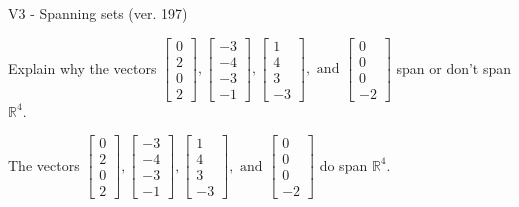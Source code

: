 \begin{exercise}
  \begin{exerciseTitle}V3 - Spanning sets (ver. 197)\end{exerciseTitle}
  \begin{exerciseStatement}
    Explain why the vectors \(\left[\begin{array}{r}
0 \\
2 \\
0 \\
2
\end{array}\right] , \left[\begin{array}{r}
-3 \\
-4 \\
-3 \\
-1
\end{array}\right] , \left[\begin{array}{r}
1 \\
4 \\
3 \\
-3
\end{array}\right] , \text{ and } \left[\begin{array}{r}
0 \\
0 \\
0 \\
-2
\end{array}\right]\) span or don't span \(\mathbb{R}^4\). 
	


  \end{exerciseStatement}
  \begin{exerciseAnswer}
   The vectors \(\left[\begin{array}{r}
0 \\
2 \\
0 \\
2
\end{array}\right] , \left[\begin{array}{r}
-3 \\
-4 \\
-3 \\
-1
\end{array}\right] , \left[\begin{array}{r}
1 \\
4 \\
3 \\
-3
\end{array}\right] , \text{ and } \left[\begin{array}{r}
0 \\
0 \\
0 \\
-2
\end{array}\right]\) 
  	 do  
	span \(\mathbb{R}^4\).
  


  \end{exerciseAnswer}
\end{exercise}